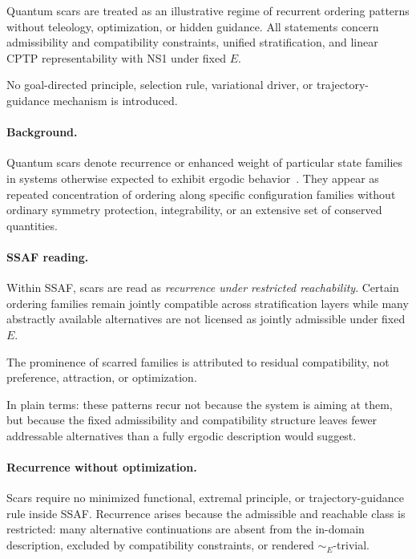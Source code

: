 \documentclass[aps,prx,onecolumn,11pt]{revtex4-2}
\theoremstyle{plain}
\theoremstyle{definition}
\theoremstyle{remark}
\begin{document}
Quantum scars are treated as an illustrative regime of recurrent
ordering patterns without teleology, optimization, or hidden guidance.
All statements concern admissibility and compatibility constraints,
unified stratification, and linear CPTP representability with NS1 under
fixed \(E\).

No goal-directed principle, selection rule, variational driver, or
trajectory-guidance mechanism is introduced.

\paragraph{Background.}

Quantum scars denote recurrence or enhanced weight of particular state
families in systems otherwise expected to exhibit ergodic
behavior~\cite{Heller1984,Turner2018}. They appear as repeated
concentration of ordering along specific configuration families without
ordinary symmetry protection, integrability, or an extensive set of
conserved quantities.

\paragraph{SSAF reading.}

Within SSAF, scars are read as \emph{recurrence under restricted
reachability}. Certain ordering families remain jointly compatible
across stratification layers while many abstractly available
alternatives are not licensed as jointly admissible under fixed \(E\).

The prominence of scarred families is attributed to residual
compatibility, not preference, attraction, or optimization.

In plain terms: these patterns recur not because the system is aiming
at them, but because the fixed admissibility and compatibility
structure leaves fewer addressable alternatives than a fully ergodic
description would suggest.

\paragraph{Recurrence without optimization.}

Scars require no minimized functional, extremal principle, or
trajectory-guidance rule inside SSAF. Recurrence arises because the
admissible and reachable class is restricted: many alternative
continuations are absent from the in-domain description, excluded by
compatibility constraints, or rendered \(\sim_E\)-trivial.
\end{document}
